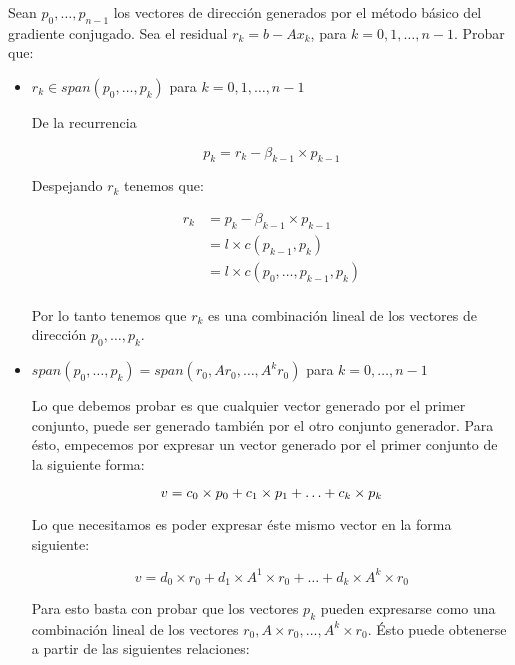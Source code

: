 Sean $p_0, \ldots, p_{n-1}$ los vectores de dirección generados por el método básico del gradiente conjugado. Sea el residual $r_k = b - Ax_k$, para $k=0,1,\ldots,n-1$. Probar que:
\begin{itemize}
    \item $r_k \in span(p_0, \ldots, p_k)$ para $k=0,1,\ldots,n-1$
    
    De la recurrencia
    
    \begin{equation*}
        p_k = r_k - \beta_{k-1} \times p_{k-1}
    \end{equation*}
    
    Despejando $r_k$ tenemos que:
    
    \begin{align*}
        r_k &= p_k - \beta_{k-1} \times p_{k-1}\\
        &= l \times c(p_{k-1}, p_k) \\
        &= l \times c(p_0, \ldots, p_{k-1}, p_k) \\
    \end{align*}
    
    Por lo tanto tenemos que $r_k$ es una combinación lineal de los vectores de dirección $p_0, \ldots, p_k$.
    
    \item $span(p_0, \ldots, p_k) = span(r_0, Ar_0, \ldots, A^kr_0) $ para $k=0, \ldots, n-1$
    
    Lo que debemos probar es que cualquier vector generado por el primer conjunto, puede ser generado también por el otro conjunto generador. Para ésto, empecemos por expresar un vector generado por el primer conjunto de la siguiente forma:
    
    \begin{equation*}
        v = c_0 \times p_0 + c_1 \times p_1 + \ldots + c_k \times p_k\\
    \end{equation*}
    
    Lo que necesitamos es poder expresar éste mismo vector en la forma siguiente: 
    
    \begin{equation*}
        v = d_0 \times r_0 + d_1 \times A^1 \times r_0 + \ldots + d_k \times A^k \times r_0
    \end{equation*}
    
    Para esto basta con probar que los vectores $p_k$ pueden expresarse como una combinación lineal de los vectores $r_0, A \times r_0, \ldots, A^k \times r_0$. Ésto puede obtenerse a partir de las siguientes relaciones:
    

\end{itemize}
